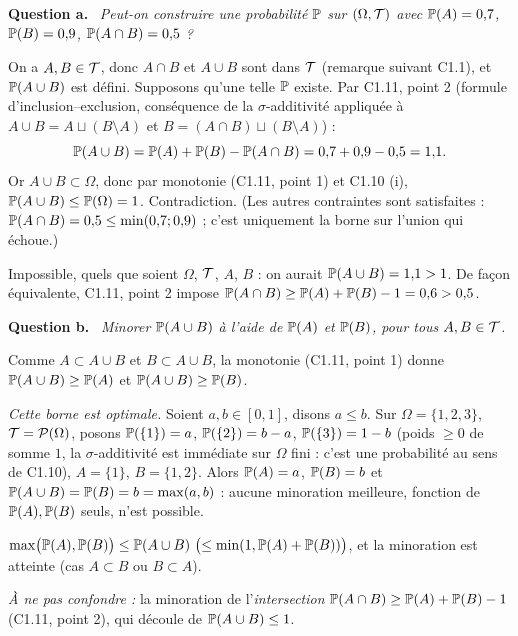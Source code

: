 \documentclass[11pt,a4paper]{article}
\newcommand{\question}[1]{\par\medskip\noindent\textbf{Question #1.}~}
\begin{document}
\begin{exo}
\question{a} \emph{Peut-on construire une probabilité $\mathbb{P}$ sur $(\Omega,\mathcal{T})$ avec $\mathbb{P}(A)=0{,}7$, $\mathbb{P}(B)=0{,}9$, $\mathbb{P}(A\cap B)=0{,}5$ ?}

On a $A,B\in\mathcal{T}$, donc $A\cap B$ et $A\cup B$ sont dans $\mathcal{T}$ (remarque suivant C1.1), et $\mathbb{P}(A\cup B)$ est défini.
Supposons qu'une telle $\mathbb{P}$ existe. Par C1.11, point 2 (formule d'inclusion--exclusion, conséquence de la $\sigma$-additivité appliquée à
$A\cup B=A\sqcup(B\setminus A)$ et $B=(A\cap B)\sqcup(B\setminus A)$) :
\[\mathbb{P}(A\cup B)=\mathbb{P}(A)+\mathbb{P}(B)-\mathbb{P}(A\cap B)=0{,}7+0{,}9-0{,}5=1{,}1.\]
Or $A\cup B\subset\Omega$, donc par monotonie (C1.11, point 1) et C1.10 (i), $\mathbb{P}(A\cup B)\le\mathbb{P}(\Omega)=1$. Contradiction.
(Les autres contraintes sont satisfaites : $\mathbb{P}(A\cap B)=0{,}5\le\min(0{,}7;0{,}9)$ ; c'est uniquement la borne sur l'union qui échoue.)
\begin{resultat}
Impossible, quels que soient $\Omega$, $\mathcal{T}$, $A$, $B$ : on aurait $\mathbb{P}(A\cup B)=1{,}1>1$.
De façon équivalente, C1.11, point 2 impose $\mathbb{P}(A\cap B)\ge\mathbb{P}(A)+\mathbb{P}(B)-1=0{,}6>0{,}5$.
\end{resultat}

\question{b} \emph{Minorer $\mathbb{P}(A\cup B)$ à l'aide de $\mathbb{P}(A)$ et $\mathbb{P}(B)$, pour tous $A,B\in\mathcal{T}$.}

Comme $A\subset A\cup B$ et $B\subset A\cup B$, la monotonie (C1.11, point 1) donne $\mathbb{P}(A\cup B)\ge\mathbb{P}(A)$ et $\mathbb{P}(A\cup B)\ge\mathbb{P}(B)$.

\emph{Cette borne est optimale.} Soient $a,b\in[0,1]$, disons $a\le b$. Sur $\Omega=\{1,2,3\}$, $\mathcal{T}=\mathcal{P}(\Omega)$, posons
$\mathbb{P}(\{1\})=a$, $\mathbb{P}(\{2\})=b-a$, $\mathbb{P}(\{3\})=1-b$ (poids $\ge0$ de somme $1$, la $\sigma$-additivité est immédiate sur $\Omega$ fini : c'est une probabilité au sens de C1.10), $A=\{1\}$, $B=\{1,2\}$.
Alors $\mathbb{P}(A)=a$, $\mathbb{P}(B)=b$ et $\mathbb{P}(A\cup B)=\mathbb{P}(B)=b=\max(a,b)$ : aucune minoration meilleure, fonction de $\mathbb{P}(A),\mathbb{P}(B)$ seuls, n'est possible.
\begin{resultat}
$\max\bigl(\mathbb{P}(A),\mathbb{P}(B)\bigr)\le\mathbb{P}(A\cup B)\ \bigl(\le\min(1,\mathbb{P}(A)+\mathbb{P}(B))\bigr)$, et la minoration est atteinte (cas $A\subset B$ ou $B\subset A$).
\end{resultat}
\textit{À ne pas confondre :} la minoration de l'\emph{intersection} $\mathbb{P}(A\cap B)\ge\mathbb{P}(A)+\mathbb{P}(B)-1$ (C1.11, point 2), qui découle de $\mathbb{P}(A\cup B)\le1$.
\end{exo}
\end{document}

